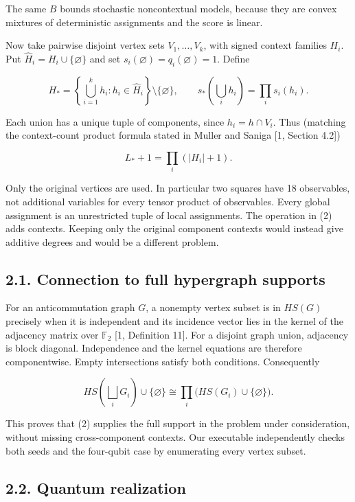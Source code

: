 \documentclass[10pt,a4paper]{article}
\begin{document}
The same \(B\) bounds stochastic noncontextual models, because they are convex mixtures of deterministic assignments and the score is linear.

Now take pairwise disjoint vertex sets \(V_1,\ldots,V_k\), with signed context families \(H_i\). Put \(\widehat H_i=H_i\cup\{\varnothing\}\) and set \(s_i(\varnothing)=q_i(\varnothing)=1\). Define

\[H_* = \left\{\bigcup_{i=1}^k h_i:
h_i\in\widehat H_i\right\}\setminus\{\varnothing\},
\qquad s_*\!\left(\bigcup_i h_i\right)=\prod_i s_i(h_i). \tag{2}\]

Each union has a unique tuple of components, since \(h_i=h\cap V_i\). Thus (matching the context-count product formula stated in Muller and Saniga {[}1, Section 4.2{]})

\[L_*+1=\prod_i(|H_i|+1). \tag{3}\]

Only the original vertices are used. In particular two squares have 18 observables, not additional variables for every tensor product of observables. Every global assignment is an unrestricted tuple of local assignments. The operation in (2) adds contexts. Keeping only the original component contexts would instead give additive degrees and would be a different problem.

\subsection{2.1. Connection to full hypergraph supports}\label{connection-to-full-hypergraph-supports}

For an anticommutation graph \(G\), a nonempty vertex subset is in \(HS(G)\) precisely when it is independent and its incidence vector lies in the kernel of the adjacency matrix over \(\mathbb F_2\) {[}1, Definition 11{]}. For a disjoint graph union, adjacency is block diagonal. Independence and the kernel equations are therefore componentwise. Empty intersections satisfy both conditions. Consequently

\[HS\!\left(\bigsqcup_iG_i\right)\cup\{\varnothing\}
\cong\prod_i\bigl(HS(G_i)\cup\{\varnothing\}\bigr). \tag{4}\]

This proves that (2) supplies the full support in the problem under consideration, without missing cross-component contexts. Our executable independently checks both seeds and the four-qubit case by enumerating every vertex subset.

\subsection{2.2. Quantum realization}\label{quantum-realization}
\end{document}
